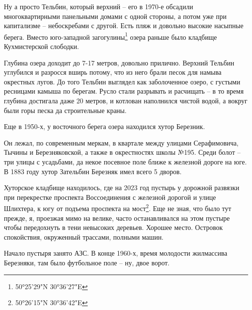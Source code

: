 Ну а просто Тельбин, который верхний – его в 1970-е обсадили многоквартирными панельными домами с одной стороны, а потом уже при капитализме – небоскребами с другой. Есть пляж и довольно высокие насыпные берега. Вместо юго-западной загогулины\footnote{50°25'29"N 30°36'27"E} озера раньше было кладбище Кухмистерской слободки.

Глубина озера доходит до 7-17 метров, довольно прилично. Верхний Тельбин углубился и разросся вширь потому, что из него брали песок для намыва окрестных лугов. До того Тельбин выглядел как заболоченное озеро, с густыми ресницами камыша по берегам. Русло стали разрывать и расчищать – в то время глубина достигала даже 20 метров, и котлован наполнился чистой водой, а вокруг были горы песка да строительные краны.

Еще в 1950-х, у восточного берега озера находился хутор Березник.

Он лежал, по современным меркам, в квартале между улицами Серафимовича, Тычины и Березняковской, а также в окрестностях школы №195. Среди болот – три улицы с усадьбами, да некое посевное поле ближе к железной дороге на юге. В 1883 году хутор Зательбин Березняк имел всего 5 дворов.

Хуторское кладбище находилось, где на 2023 год пустырь у дорожной развязки при перекрестке проспекта Воссоединения с железной дорогой и улице Шлихтера, к югу от подъема проспекта на мост\footnote{50°26'15"N 30°36'42"E}. Еще не зная, что было тут прежде, я, проезжая мимо на велике, часто останавливался на этом пустыре чтобы передохнуть в тени невысоких деревьев. Хорошее место. Островок спокойствия, окруженный трассами, полными машин.

Начало пустыря занято АЗС. В конце 1960-х, время молодости жилмассива Березняки, там было футбольное поле – ну, двое ворот. 




